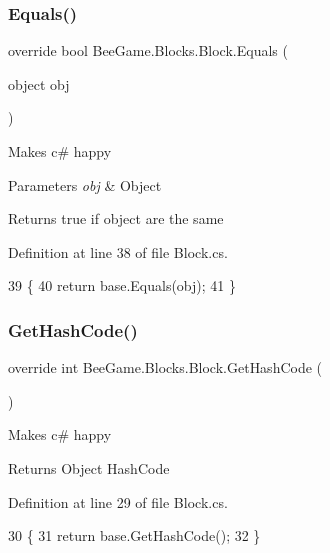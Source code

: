 \subsubsection{\texorpdfstring{Equals()}{Equals()}}
{\footnotesize\ttfamily override bool Bee\+Game.\+Blocks.\+Block.\+Equals (\begin{DoxyParamCaption}\item[{object}]{obj }\end{DoxyParamCaption})}



Makes c\# happy 


\begin{DoxyParams}{Parameters}
{\em obj} & Object\\
\hline
\end{DoxyParams}
\begin{DoxyReturn}{Returns}
true if object are the same
\end{DoxyReturn}


Definition at line 38 of file Block.\+cs.


\begin{DoxyCode}
39         \{
40             \textcolor{keywordflow}{return} base.Equals(obj);
41         \}
\end{DoxyCode}
\mbox{\label{class_bee_game_1_1_blocks_1_1_block_a803b906cb4fcfdb10157177a1468dbac}} 
\subsubsection{\texorpdfstring{Get\+Hash\+Code()}{GetHashCode()}}
{\footnotesize\ttfamily override int Bee\+Game.\+Blocks.\+Block.\+Get\+Hash\+Code (\begin{DoxyParamCaption}{ }\end{DoxyParamCaption})}



Makes c\# happy 

\begin{DoxyReturn}{Returns}
Object Hash\+Code
\end{DoxyReturn}


Definition at line 29 of file Block.\+cs.


\begin{DoxyCode}
30         \{
31             \textcolor{keywordflow}{return} base.GetHashCode();
32         \}
\end{DoxyCode}
\mbox{\label{class_bee_game_1_1_blocks_1_1_block_ac5ac088908d491883260b5c24d3caf79}} 
